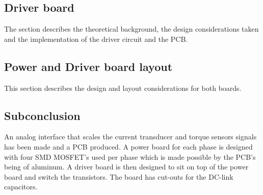 \subsection{Driver board}
The section describes the theoretical background, the design considerations taken and the implementation of the driver circuit and the PCB.



\subsection{Power and Driver board layout}
This section describes the design and layout considerations for both boards.


\subsection*{Subconclusion}
An analog interface that scales the current transducer and torque sensors signals has been made and a PCB produced. 
A power board for each phase is designed with four SMD MOSFET's used per phase which is made possible by the PCB's being of aluminum. 
A driver board is then designed to sit on top of the power board and switch the transistors. The board has cut-outs for the DC-link capacitors.


